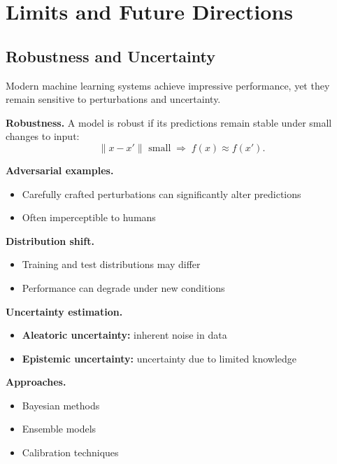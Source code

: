 \chapter{Limits and Future Directions}

\section{Robustness and Uncertainty}

Modern machine learning systems achieve impressive performance, yet they remain sensitive to perturbations and uncertainty.

\medskip

\noindent
\textbf{Robustness.}  
A model is robust if its predictions remain stable under small changes to input:
\[
\|x - x'\| \text{ small} \;\Rightarrow\; f(x) \approx f(x').
\]

\medskip

\noindent
\textbf{Adversarial examples.}
\begin{itemize}
    \item Carefully crafted perturbations can significantly alter predictions
    \item Often imperceptible to humans
\end{itemize}

\medskip

\noindent
\textbf{Distribution shift.}
\begin{itemize}
    \item Training and test distributions may differ
    \item Performance can degrade under new conditions
\end{itemize}

\medskip

\noindent
\textbf{Uncertainty estimation.}
\begin{itemize}
    \item \textbf{Aleatoric uncertainty:} inherent noise in data
    \item \textbf{Epistemic uncertainty:} uncertainty due to limited knowledge
\end{itemize}

\medskip

\noindent
\textbf{Approaches.}
\begin{itemize}
    \item Bayesian methods
    \item Ensemble models
    \item Calibration techniques
\end{itemize}

